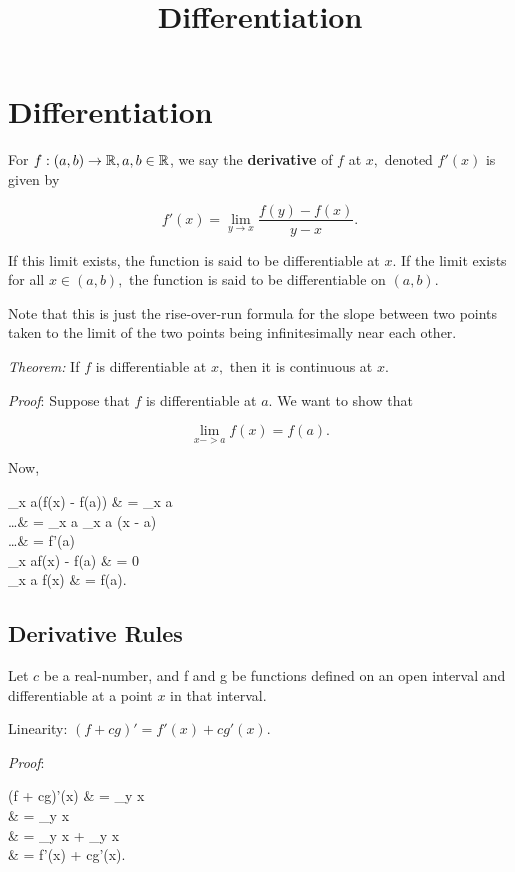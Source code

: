 \documentclass{article}
\title{Differentiation}
\begin{document}
\section{Differentiation}

For $f: (a,b) \to \mathbb{R}, a,b \in \mathbb{R}$, we say the \textbf{derivative} of $f$ at $x,$ denoted $f'(x)$ is given by

\[ f'(x) = \lim_{y \to x} \frac{f(y) - f(x)}{y - x}. \]

If this limit exists, the function is said to be differentiable at $x.$ If the limit exists for all $x \in (a,b),$ the function is said to be differentiable on $(a,b).$

Note that this is just the rise-over-run formula for the slope between two points taken to the limit of the two points being infinitesimally near each other.

\emph{Theorem:} If $f$ is \@{differentiable} at $x,$ then it is \@{continuous} at $x.$

\emph{Proof}: Suppose that $f$ is differentiable at $a.$ We want to show that

\[ \lim_{x -> a} f(x) = f(a). \]

Now,

\bal
    \lim_{x \to a}(f(x) - f(a)) & = \lim_{x \to a}  \\
                \dots                   & = \lim_{x \to a}  \cdot \lim_{x \to a} (x - a) \\
                \dots                    & = f'(a)  \\
    \lim_{x \to a}f(x) - f(a)       & = 0 \\
    \lim_{x \to a} f(x)             & = f(a). \square
    \eal

\subsection{Derivative Rules}

Let $c$ be a \@{real-number}, and f and g be functions defined on an \@{open} \@{interval} and \@{differentiable} at a point $x$ in that interval.

Linearity: $(f+cg)' = f'(x) + cg'(x).$

\emph{Proof}:

\bal
    (f + cg)'(x) & = \lim_{y \to x}  \\
                 & = \lim_{y \to x}  \\
                 & = \lim_{y \to x}  + \lim_{y \to x}  \\
                 & = f'(x) + cg'(x). ~ \square
\eal
\end{document}
